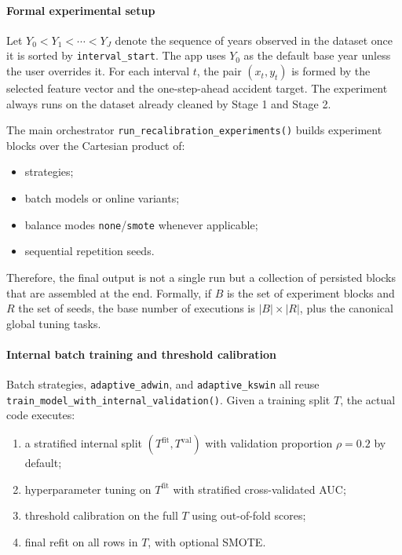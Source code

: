 \paragraph{Formal experimental setup}
Let \(Y_0 < Y_1 < \cdots < Y_J\) denote the sequence of years observed in the dataset once it is sorted by \texttt{interval\_start}. The app uses \(Y_0\) as the default base year unless the user overrides it. For each interval \(t\), the pair \((x_t, y_t)\) is formed by the selected feature vector and the one-step-ahead accident target. The experiment always runs on the dataset already cleaned by Stage 1 and Stage 2.

The main orchestrator \texttt{run\_recalibration\_experiments()} builds experiment blocks over the Cartesian product of:
\begin{itemize}[leftmargin=*]
  \item strategies;
  \item batch models or online variants;
  \item balance modes \texttt{none}/\texttt{smote} whenever applicable;
  \item sequential repetition seeds.
\end{itemize}
Therefore, the final output is not a single run but a collection of persisted blocks that are assembled at the end. Formally, if \(B\) is the set of experiment blocks and \(R\) the set of seeds, the base number of executions is \(|B|\times|R|\), plus the canonical global tuning tasks.

\paragraph{Internal batch training and threshold calibration}
Batch strategies, \texttt{adaptive\_adwin}, and \texttt{adaptive\_kswin} all reuse \texttt{train\_model\_with\_internal\_validation()}. Given a training split \(T\), the actual code executes:
\begin{enumerate}[leftmargin=*]
  \item a stratified internal split \((T^{\mathrm{fit}}, T^{\mathrm{val}})\) with validation proportion \(\rho = 0.2\) by default;
  \item hyperparameter tuning on \(T^{\mathrm{fit}}\) with stratified cross-validated AUC;
  \item threshold calibration on the full \(T\) using out-of-fold scores;
  \item final refit on all rows in \(T\), with optional SMOTE.
\end{enumerate}

